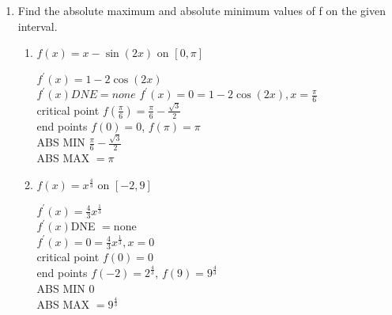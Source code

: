 \documentclass{article}
\begin{document}
\begin{enumerate}[label = \arabic*)]
	\item Find the absolute maximum and absolute minimum values of f on the given interval.
	
	\begin{enumerate}
	    \item $f(x) = x - \sin(2x)$ on $[0,\pi]$ 
	    
	    \begin{center}
	        $f^\prime(x) = 1 - 2\cos(2x)$\\
	        $f^\prime(x) DNE = none$
	        $f^\prime(x) = 0 = 1 - 2\cos(2x), x = \frac{\pi}{6}$\\
	        critical point $f(\frac{\pi}{6}) = \frac{\pi}{6} - \frac{\sqrt{3}}{2}$\\ 
	        end points $f(0) = 0$, $f(\pi) = \pi$\\
	        ABS MIN $\frac{\pi}{6} - \frac{\sqrt{3}}{2}$\\
	        ABS MAX $= \pi$
	    \end{center}
	    
	    \item $f(x) = x^{\frac{4}{3}}$ on $[-2,9]$
	    
	        \begin{center}
	        $f^\prime(x) = \frac{4}{3} x^{\frac{1}{3}}$\\
	        $f^\prime(x) $DNE $= $none \\
	        $f^\prime(x) = 0 = \frac{4}{3} x^{\frac{1}{3}}, x = 0$\\
	        critical point $f(0) = 0$\\ 
	        end points $f(-2) = 2^{\frac{4}{3}}$, $f(9) = 9^{\frac{4}{3}}$\\
	        ABS MIN $0$\\
	        ABS MAX $ = 9^{\frac{4}{3}}$
	    \end{center}
	    
	    
	\end{enumerate}
	    
	    
\end{enumerate}
\end{document}
